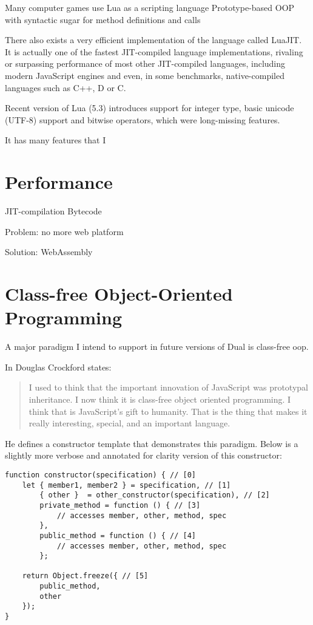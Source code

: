 Many computer games use Lua as a scripting language\cite{lua_games_category_wikipedia}
Prototype-based OOP with syntactic sugar for method definitions and calls

There also exists a very efficient implementation of the language called LuaJIT\cite{LuaJIT}. It is actually one of the fastest JIT-compiled language implementations, rivaling or surpassing performance of most other JIT-compiled languages, including modern JavaScript engines and even, in some benchmarks, native-compiled languages such as C++, D or C\cite[Speed vs other languages]{lua_perl}\cite[Section~Results]{mateo_benchmarks}\cite{wren_performance, pl_benchmarks, lua_c_performance}.

Recent version of Lua (5.3)\cite{lua_5_3} introduces support for integer type, basic unicode (UTF-8) support and bitwise operators, which were long-missing features.

It has many features that I

\section{Performance}
JIT-compilation
Bytecode

Problem:
no more web platform

Solution:
WebAssembly

\section{Class-free Object-Oriented Programming}
A major paradigm I intend to support in future versions of Dual is class-free \acrshort{oop}.

In \cite{crockford_class_free} Douglas Crockford states:
\begin{quote}
    I used to think that the important innovation of JavaScript was prototypal inheritance. I now think it is class-free object oriented programming. I think that is JavaScript’s gift to humanity. That is the thing that makes it really interesting, special, and an important language. 
\end{quote}

He defines a constructor template that demonstrates this paradigm. Below is a slightly more verbose and annotated for clarity version of this constructor:
\begin{lstlisting}
function constructor(specification) { // [0]
    let { member1, member2 } = specification, // [1]
        { other }  = other_constructor(specification), // [2]
        private_method = function () { // [3]
            // accesses member, other, method, spec
        },
        public_method = function () { // [4]
            // accesses member, other, method, spec
        };
    
    return Object.freeze({ // [5]
        public_method,
        other
    });
}
\end{lstlisting}

